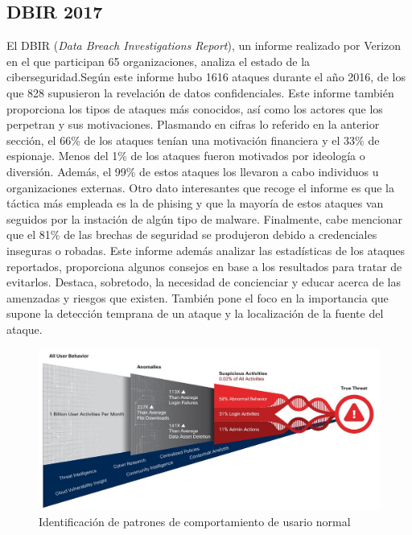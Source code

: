 \subsection{DBIR 2017}
El DBIR (\textit{Data Breach Investigations Report}), un informe realizado por Verizon en el que participan 65 organizaciones, analiza el estado de la ciberseguridad.Según este informe hubo 1616 ataques durante el año 2016, de los que 828 supusieron la revelación de datos confidenciales. Este informe también proporciona los tipos de ataques más conocidos, así como los actores que los perpetran y sus motivaciones. Plasmando en cifras lo referido en la anterior sección, el 66\% de los ataques tenían una motivación financiera y el 33\% de espionaje. Menos del 1\% de los ataques fueron motivados por ideología o diversión. Además, el 99\% de estos ataques los llevaron a cabo individuos u organizaciones externas. Otro dato interesantes que recoge el informe es que la táctica más empleada es la de phising y que la mayoría de estos ataques van seguidos por la instación de algún tipo de malware. Finalmente, cabe mencionar que el 81\% de las brechas de seguridad se produjeron debido a credenciales inseguras o robadas. Este informe además analizar las estadísticas de los ataques reportados, proporciona algunos consejos en base a los resultados para tratar de evitarlos. Destaca, sobretodo, la necesidad de concienciar y educar acerca de las amenzadas y riesgos que existen. También pone el foco en la importancia que supone la detección temprana de un ataque y la localización de la fuente del ataque\cite{DBIR2017}.
\begin{figure}[t]
\centering
\includegraphics[width=1\textwidth]{images/userBehavior.png}
\caption{Identificación de patrones de comportamiento de usario normal}
\label{fig:behavior}
\end{figure}


